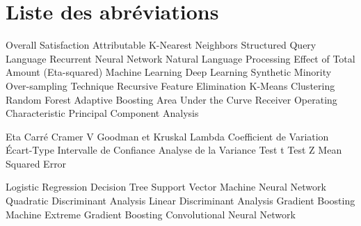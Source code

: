 \chapter*{Liste des abréviations}

\adjustmtc
\thispagestyle{MyStyle}

\begin{acronym}
 {Overall Satisfaction Attributable}
 {K-Nearest Neighbors}
 {Structured Query Language}
 {Recurrent Neural Network}
 {Natural Language Processing}
 {Effect of Total Amount (Eta-squared)}
 {Machine Learning}
 {Deep Learning}
 {Synthetic Minority Over-sampling Technique}
 {Recursive Feature Elimination}
 {K-Means Clustering}
 {Random Forest}
 {Adaptive Boosting}
 {Area Under the Curve}
 {Receiver Operating Characteristic}
 {Principal Component Analysis}

 {Eta Carré}
 {Cramer V}
 {Goodman et Kruskal Lambda}
 {Coefficient de Variation}
 {Écart-Type}
 {Intervalle de Confiance}
 {Analyse de la Variance}
 {Test t}
 {Test Z}
 {Mean Squared Error}

 {Logistic Regression}
 {Decision Tree}
 {Support Vector Machine}
 {Neural Network}
 {Quadratic Discriminant Analysis}
 {Linear Discriminant Analysis}
 {Gradient Boosting Machine}
 {Extreme Gradient Boosting}
 {Convolutional Neural Network}













\end{acronym}